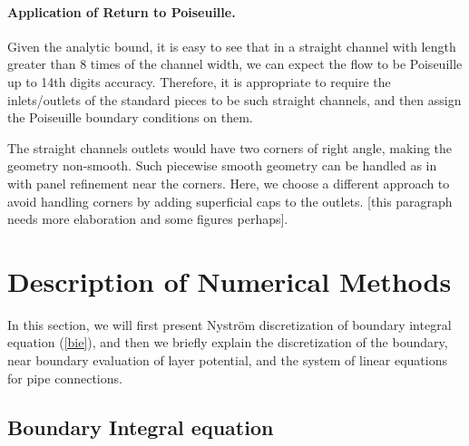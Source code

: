 \documentclass[10pt,twocolumn]{article}
\begin{document}
\paragraph*{Application of Return to Poiseuille.} Given the analytic bound, it is easy to see
that in a straight channel with length greater than 8 times of the channel width, we can expect the 
flow to be Poiseuille up to 14th digits accuracy. Therefore, it is appropriate to require the inlets/outlets of
the standard pieces to be such straight channels, and then assign the Poiseuille boundary conditions on them. 

The straight channels outlets would have two corners of right angle, making the geometry non-smooth. Such piecewise 
smooth geometry can be handled as in \cite{wuSolutionStokesFlow2020} with panel refinement near the corners. 
Here, we choose a different approach to avoid handling corners by adding superficial caps to the outlets. 
[this paragraph needs more elaboration and some figures perhaps]. 


\section{Description of Numerical Methods\label{sec:numericalmethod}}
In this section, we will first present Nystr\"om discretization of boundary integral equation (\ref{bie}), 
and then we briefly explain the discretization of the boundary, near boundary evaluation of layer potential, 
and the system of linear equations for pipe connections.  

\subsection{Boundary Integral equation}
\end{document}
